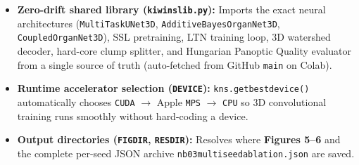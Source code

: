 \documentclass[10pt,a4paper]{article}
\renewcommand{\_}{\origunderscore\allowbreak}
\begin{document}
\begin{itemize}
\item \textbf{Zero-drift shared library (\texttt{kiwi\_ns\_lib.py}):} Imports the exact neural architectures (\texttt{MultiTaskUNet3D}, \texttt{AdditiveBayesOrganNet3D}, \texttt{CoupledOrganNet3D}), SSL pretraining, LTN training loop, 3D watershed decoder, hard-core clump splitter, and Hungarian Panoptic Quality evaluator from a single source of truth (auto-fetched from GitHub \texttt{main} on Colab).
\item \textbf{Runtime accelerator selection (\texttt{DEVICE}):} \texttt{kns.get\_best\_device()} automatically chooses \texttt{CUDA} $\to$ Apple \texttt{MPS} $\to$ \texttt{CPU} so 3D convolutional training runs smoothly without hard-coding a device.
\item \textbf{Output directories (\texttt{FIG\_DIR}, \texttt{RES\_DIR}):} Resolves where \textbf{Figures 5--6} and the complete per-seed JSON archive \texttt{nb03\_multiseed\_ablation.json} are saved.
\end{itemize}
\end{document}
